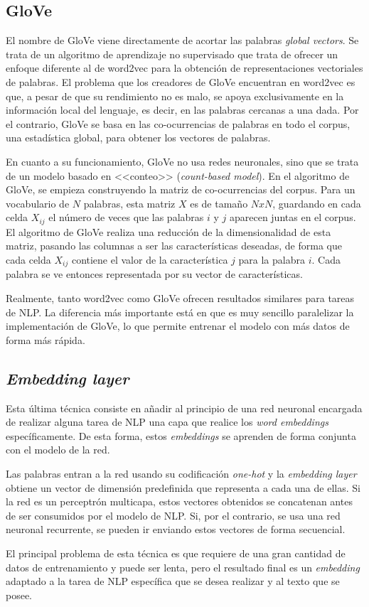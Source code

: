 \subsection{GloVe}

El nombre de GloVe viene directamente de acortar las palabras \textit{global
    vectors}. Se trata de un algoritmo de aprendizaje no supervisado que trata
de ofrecer un enfoque diferente al de word2vec para la obtención de
representaciones vectoriales de palabras. El problema que los creadores de
GloVe encuentran en word2vec es que, a pesar de que su rendimiento no es
malo, se apoya exclusivamente en la información local del lenguaje, es
decir, en las palabras cercanas a una dada. Por el contrario, GloVe se basa
en las co-ocurrencias de palabras en todo el corpus, una estadística global,
para obtener los vectores de palabras.

En cuanto a su funcionamiento, GloVe no usa redes neuronales, sino que se trata
de un modelo basado en <<conteo>> (\textit{count-based model}). En el algoritmo de
GloVe, se empieza construyendo la matriz de co-ocurrencias del corpus. Para un
vocabulario de $N$ palabras, esta matriz $X$ es de tamaño $NxN$, guardando en
cada celda $X_{ij}$ el número de veces que las palabras $i$ y $j$ aparecen
juntas en el corpus. El algoritmo de GloVe realiza una reducción de la
dimensionalidad de esta matriz, pasando las columnas a ser las características
deseadas, de forma que cada celda $X_{ij}$ contiene el valor de la
característica $j$ para la palabra $i$. Cada palabra se ve entonces representada
por su vector de características.

Realmente, tanto word2vec como GloVe ofrecen resultados similares para tareas de
NLP. La diferencia más importante está en que es muy sencillo paralelizar la
implementación de GloVe, lo que permite entrenar el modelo con más datos de
forma más rápida.

\subsection{\textit{Embedding layer}}
\label{subsec:embedding-layer}

Esta última técnica consiste en añadir al principio de una red neuronal
encargada de realizar alguna tarea de NLP una capa que realice los \textit{word
    embeddings} específicamente. De esta forma, estos \textit{embeddings} se
aprenden de forma conjunta con el modelo de la red.

Las palabras entran a la red usando su codificación \textit{one-hot} y la
\textit{embedding layer} obtiene un vector de dimensión predefinida que
representa a cada una de ellas. Si la red es un perceptrón multicapa, estos
vectores obtenidos se concatenan antes de ser consumidos por el modelo de NLP.
Si, por el contrario, se usa una red neuronal recurrente, se pueden ir enviando
estos vectores de forma secuencial.

El principal problema de esta técnica es que requiere de una gran cantidad de
datos de entrenamiento y puede ser lenta, pero el resultado final es un
\textit{embedding} adaptado a la tarea de NLP específica que se desea realizar
y al texto que se posee.
